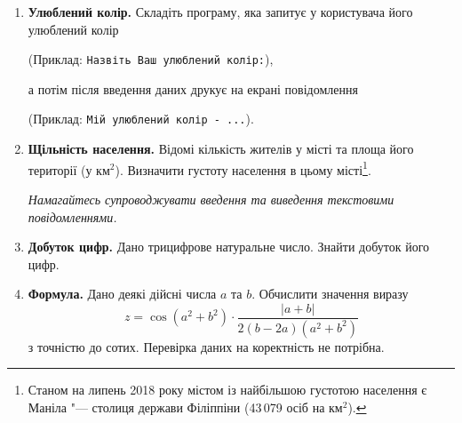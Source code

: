 \begin{enumerate}

\item \textbf{Улюблений колір.} Складіть програму, яка запитує у користувача його улюблений колір

(Приклад: \verb|Назвіть Ваш улюблений колір:|),

а потім після введення даних друкує на екрані повідомлення

(Приклад: \verb|Мій улюблений колір - ...|).

\item \textbf{Щільність населення.} Відомі кількість жителів у місті та площа його території (у км$^2$). Визначити густоту населення в цьому місті\footnote{Станом на липень 2018 року містом із найбільшою густотою населення є Маніла "--- столиця держави Філіппіни (43\,079 осіб на км$^2$).}.

{\itshape Намагайтесь супроводжувати введення та виведення текстовими повідомленнями.}

\item \textbf{Добуток цифр.} Дано трицифрове натуральне число. Знайти добуток його цифр.

\item \textbf{Формула.} Дано деякі дійсні числа $a$ та $b$. Обчислити значення виразу
$$
z=\cos(a^2+b^2)\cdot\dfrac{|a+b|}{2(b-2a)(a^2+b^2)}
$$
з точністю до сотих. Перевірка даних на коректність не потрібна.
\end{enumerate}




